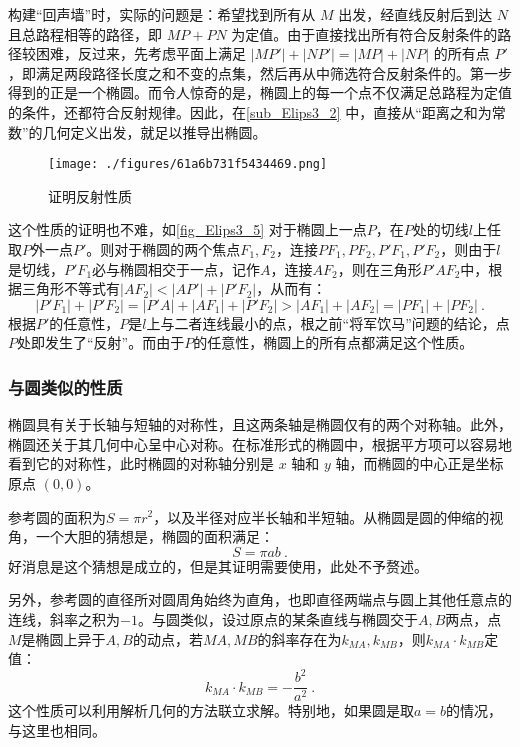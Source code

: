 构建“回声墙”时，实际的问题是：希望找到所有从 $M$ 出发，经直线反射后到达 $N$ 且总路程相等的路径，即 $MP + PN$ 为定值。由于直接找出所有符合反射条件的路径较困难，反过来，先考虑平面上满足 $|MP'| + |NP'| = |MP| + |NP|$ 的所有点 $P'$，即满足两段路径长度之和不变的点集，然后再从中筛选符合反射条件的。第一步得到的正是一个椭圆。而令人惊奇的是，椭圆上的每一个点不仅满足总路程为定值的条件，还都符合反射规律。因此，在\autoref{sub_Elips3_2} 中，直接从“距离之和为常数”的几何定义出发，就足以推导出椭圆。

\begin{figure}[ht]
\centering
\texttt{[image: ./figures/61a6b731f5434469.png]}
\caption{证明反射性质} \label{fig_Elips3_5}
\end{figure}

这个性质的证明也不难，如\autoref{fig_Elips3_5} 对于椭圆上一点$P$，在$P$处的切线$l$上任取$P$外一点$P'$。则对于椭圆的两个焦点$F_1,F_2$，连接$PF_1,PF_2,P'F_1,P'F_2$，则由于$l$是切线，$P'F_1$必与椭圆相交于一点，记作$A$，连接$AF_2$，则在三角形$P'AF_2$中，根据三角形不等式有$|AF_2|<|AP'|+|P'F_2|$，从而有：
\begin{equation}
|P'F_1|+|P'F_2|=|P'A|+|AF_1|+|P'F_2|>|AF_1|+|AF_2|=|PF_1|+|PF_2|~.
\end{equation}
根据$P'$的任意性，$P$是$l$上与二者连线最小的点，根之前“将军饮马”问题的结论，点$P$处即发生了“反射”。而由于$P$的任意性，椭圆上的所有点都满足这个性质。

\subsubsection{与圆类似的性质}

椭圆具有关于长轴与短轴的对称性，且这两条轴是椭圆仅有的两个对称轴。此外，椭圆还关于其几何中心呈中心对称。在标准形式的椭圆中，根据平方项可以容易地看到它的对称性，此时椭圆的对称轴分别是 $x$ 轴和 $y$ 轴，而椭圆的中心正是坐标原点 $(0,0)$。

参考圆的面积为$S = \pi r^2$，以及半径对应半长轴和半短轴。从椭圆是圆的伸缩的视角，一个大胆的猜想是，椭圆的面积满足：
\begin{equation}
S = \pi a b~.
\end{equation}
好消息是这个猜想是成立的，但是其证明需要使用，此处不予赘述。

另外，参考圆的直径所对圆周角始终为直角，也即直径两端点与圆上其他任意点的连线，斜率之积为$-1$。与圆类似，设过原点的某条直线与椭圆交于$A,B$两点，点$M$是椭圆上异于$A,B$的动点，若$MA,MB$的斜率存在为$k_{MA},k_{MB}$，则$k_{MA}\cdot k_{MB}$定值：
\begin{equation}
k_{MA} \cdot k_{MB} = -\frac{b^2}{a^2}~.
\end{equation}
这个性质可以利用解析几何的方法联立求解。特别地，如果圆是取$a=b$的情况，与这里也相同。

